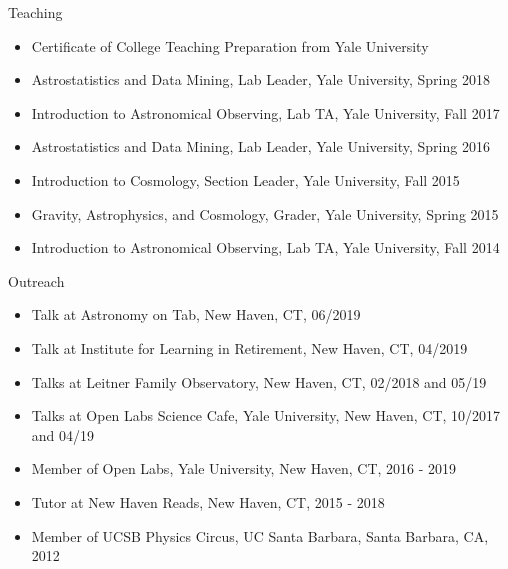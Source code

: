 \documentclass{resume}
\begin{document}
\begin{rSection}{Teaching}
  \begin{itemize}[leftmargin=1.0cm, topsep=0pt, itemsep=0pt, partopsep=0pt, parsep=0pt]
    \item Certificate of College Teaching Preparation from Yale University
    \item Astrostatistics and Data Mining, Lab Leader, Yale University, Spring 2018
    \item Introduction to Astronomical Observing, Lab TA, Yale University, Fall 2017
    \item Astrostatistics and Data Mining, Lab Leader, Yale University, Spring 2016
    \item Introduction to Cosmology, Section Leader, Yale University, Fall 2015
    \item Gravity, Astrophysics, and Cosmology, Grader, Yale University, Spring 2015
    \item Introduction to Astronomical Observing, Lab TA, Yale University, Fall 2014
  \end{itemize}
\end{rSection}

\begin{rSection}{Outreach}
  \begin{itemize}[leftmargin=1.0cm, topsep=0pt, itemsep=0pt, partopsep=0pt, parsep=0pt]
    \item Talk at Astronomy on Tab, New Haven, CT, 06/2019
    \item Talk at Institute for Learning in Retirement, New Haven, CT, 04/2019
    \item Talks at Leitner Family Observatory, New Haven, CT, 02/2018 and 05/19
    \item Talks at Open Labs Science Cafe, Yale University, New Haven, CT, 10/2017 and 04/19
    \item Member of Open Labs, Yale University, New Haven, CT, 2016 - 2019
    \item Tutor at New Haven Reads, New Haven, CT, 2015 - 2018
    \item Member of UCSB Physics Circus, UC Santa Barbara, Santa Barbara, CA, 2012
  \end{itemize}
\end{rSection}
\end{document}
